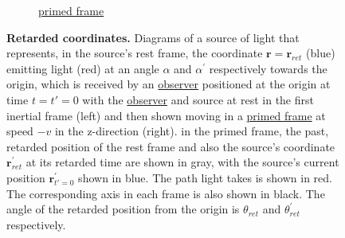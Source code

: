 \begin{figure}[ht]
\begin{subfigure}[b]{.49\textwidth}
		\caption{\hyperlink{def-Primed-Frame}{primed frame}}
	\end{subfigure}
	\caption{\textbf{Retarded coordinates.} Diagrams of a source of light that represents, in the source's rest frame, the coordinate ${\mathbf{r}} = {\mathbf{r}_{ret}}$ (blue) emitting light (red) at an angle ${\alpha}$ and ${\alpha^{'}}$ respectively towards the origin, which is received by an \protect\hyperlink{def-observer}{observer} positioned at the origin at time ${t} = {t{'}} = 0$ with the \protect\hyperlink{def-observer}{observer} and source at rest in the first inertial frame (left) and then shown moving in a \protect\hyperlink{def-Primed-Frame}{primed frame} at speed $-{v}$ in the z-direction (right). in the primed frame, the past, retarded position of the rest frame and also the source's coordinate ${\mathbf{r}_{ret}^{'}}$ at its retarded time are shown in gray, with the source's current position ${\mathbf{r}_{{t{'}} = 0}^{'}}$ shown in blue. The path light takes is shown in red. The corresponding axis in each frame is also shown in black. The angle of the retarded position from the origin is ${\theta_{ret}}$ and ${\theta_{ret}^{'}}$ respectively.}
	\label{fig: Retarded field}
\end{figure}

